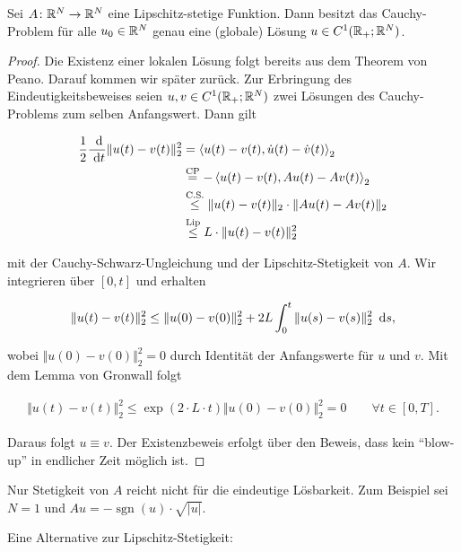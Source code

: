 \begin{theorem}
Sei $A\colon\mathbb{R}^N\to\mathbb{R}^N$ eine Lipschitz-stetige Funktion. Dann besitzt das Cauchy-Problem für alle $u_0\in\mathbb{R}^N$ genau eine (globale) Lösung $u\in C^1(\mathbb{R}_+;\mathbb{R}^N)$.
\end{theorem}
\begin{proof}
Die Existenz einer lokalen Lösung folgt bereits aus dem Theorem von Peano. Darauf kommen wir später zurück. Zur Erbringung des Eindeutigkeitsbeweises seien $u,v\in C^1(\mathbb{R}_+;\mathbb{R}^N)$ zwei Lösungen des Cauchy-Problems zum selben Anfangswert. Dann gilt 

\begin{align*}
	\frac{1}{2}\frac{\text{ d}}{\text{ d} t}\Vert u(t)-v(t)\Vert_2^2 & =\left\langle u(t)-v(t),\dot{u}(t)-\dot{v}(t)\right\rangle_2 \\
	& \stackrel{\text{CP}}{=}-\left\langle u(t)-v(t),Au(t)-Av(t)\right\rangle_2 \\
	& \stackrel{\text{C.S.}}{\leq}\Vert u(t)-v(t)\Vert_2\cdot\Vert Au(t)-Av(t)\Vert_2 \\
	& \stackrel{\text{Lip}}{\leq} L\cdot\Vert u(t)-v(t)\Vert_2^2
\end{align*}

mit der Cauchy-Schwarz-Ungleichung und der Lipschitz-Stetigkeit von $A$. Wir integrieren über $\left[0,t\right]$ und erhalten

\begin{align*}
	\Vert u(t)-v(t)\Vert_2^2\leq\Vert u(0)-v(0)\Vert_2^2+2L\int_0^t\Vert u(s)-v(s)\Vert_2^2\,\text{ d} s,
\end{align*}

wobei $\Vert u(0)-v(0)\Vert_2^2=0$ durch Identität der Anfangswerte für $u$ und $v$. Mit dem Lemma von Gronwall folgt 

\begin{align*}
	\Vert u(t)-v(t)\Vert_2^2\leq\exp(2\cdot L\cdot t)\Vert u(0)-v(0)\Vert_2^2=0\qquad\forall t\in\left[0,T\right].
\end{align*}

Daraus folgt $u\equiv v$. Der Existenzbeweis erfolgt über den Beweis, dass kein "`blow-up"' in endlicher Zeit möglich ist.
\end{proof}

\begin{bemerkung}
Nur Stetigkeit von $A$ reicht nicht für die eindeutige Lösbarkeit. Zum Beispiel sei $N=1$ und $Au=-\operatorname{sgn}(u)\cdot\sqrt{\vert u\vert}$.
\end{bemerkung}

Eine Alternative zur Lipschitz-Stetigkeit:

